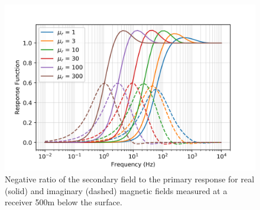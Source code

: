 \begin{figure}
    \begin{center}
    \includegraphics[width=0.6\columnwidth]{figures/augustin_response_function_mu.png}
    \end{center}
\caption{Negative ratio of the secondary field to the primary response for real (solid) and imaginary (dashed) magnetic fields measured at a receiver 500m below the surface.}
\label{fig:augustin_response_function_mu}
\end{figure}
